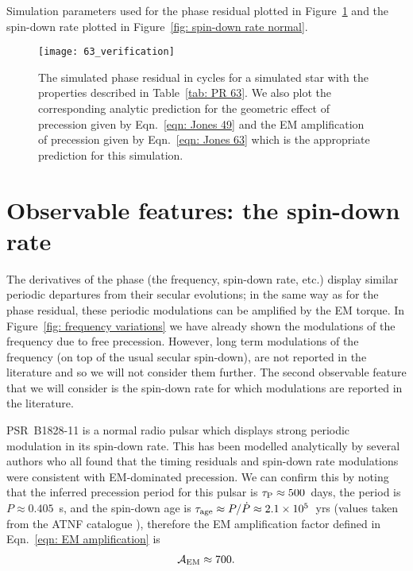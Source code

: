 \documentclass[../full_thesis/full_thesis.tex]{subfiles}
\newcommand{\thisdir}{../inertial_frame}
\begin{document}
\begin{table}[htb]
\centering

\caption{Simulation parameters used for the phase residual plotted in
Figure~\ref{fig: PR 63} and the spin-down rate plotted in
Figure~\ref{fig: spin-down rate normal}.}
\label{tab: PR 63}
\end{table}

\begin{figure}[htb]
\centering
\texttt{[image: 63\_verification]}
\caption{The simulated phase residual in cycles for a simulated star with the
properties described in Table~\ref{tab: PR 63}. We also plot the corresponding
analytic prediction for the geometric effect of precession given by
 Eqn.~\eqref{eqn: Jones 49} and the EM amplification of precession given by
Eqn.~\eqref{eqn: Jones 63} which is the appropriate prediction for this simulation.}
\label{fig: PR 63}
\end{figure}

\section{Observable features: the spin-down rate}
\label{sec: observable features: spin-down rate}

The derivatives of the phase (the frequency, spin-down rate, etc.) display
similar periodic departures from their secular evolutions; in the same way as
for the phase residual, these periodic modulations can be amplified by the
EM torque. In Figure~\ref{fig: frequency variations} we have already shown
the modulations of the frequency due to free precession. However,
long term modulations of the frequency (on top of the usual secular spin-down),
are not reported in the literature and so we will not consider them further.
The second observable feature that we will consider is the spin-down rate
for which modulations are reported in the literature.

PSR~B1828-11 is a normal radio pulsar which displays strong periodic modulation
in its spin-down rate. This has been modelled analytically by several authors
\citep{Stairs2000, Jones2001, Link2001, Akgun2006} who all found that the timing
residuals and spin-down rate modulations were consistent with EM-dominated
precession. We can confirm this by noting that the inferred precession period for this
pulsar is $\tau_{\mathrm{P}} \approx 500$~days, the period is $P\approx0.405$~s, and
the spin-down age is $\tau_{\mathrm{age}} \approx P/\dot{P} \approx 2.1 \times10^{5}$~yrs (values
taken from the ATNF catalogue \citet{ATNF}), therefore the EM amplification factor
defined in Eqn.~\eqref{eqn: EM amplification} is
\begin{align}
\mathcal{A}_{\mathrm{EM}} \approx 700.
\end{align}
\end{document}
